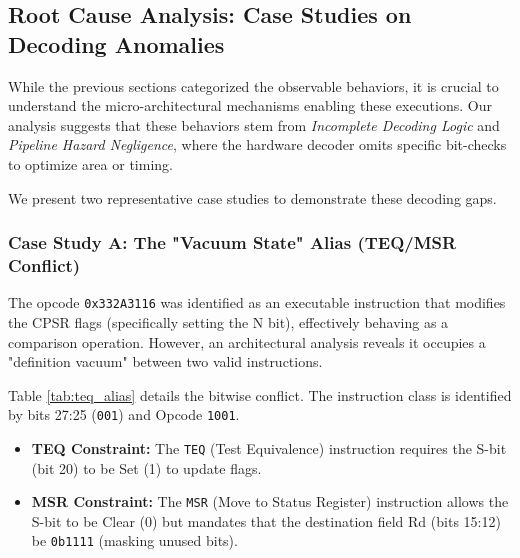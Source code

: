 \documentclass[pdflatex,sn-mathphys]{sn-jnl}%
\theoremstyle{thmstyleone}%
\theoremstyle{thmstyletwo}%
\theoremstyle{thmstylethree}%
\begin{document}
\subsection{Root Cause Analysis: Case Studies on Decoding Anomalies}
\label{sec:root_cause}

While the previous sections categorized the observable behaviors, it is crucial to understand the micro-architectural mechanisms enabling these executions. Our analysis suggests that these behaviors stem from \textit{Incomplete Decoding Logic} and \textit{Pipeline Hazard Negligence}, where the hardware decoder omits specific bit-checks to optimize area or timing.

We present two representative case studies to demonstrate these decoding gaps.

\subsubsection{Case Study A: The "Vacuum State" Alias (TEQ/MSR Conflict)}
The opcode \texttt{0x332A3116} was identified as an executable instruction that modifies the CPSR flags (specifically setting the N bit), effectively behaving as a comparison operation. However, an architectural analysis reveals it occupies a "definition vacuum" between two valid instructions.

Table \ref{tab:teq_alias} details the bitwise conflict. The instruction class is identified by bits 27:25 (\texttt{001}) and Opcode \texttt{1001}.
\begin{itemize}
    \item \textbf{TEQ Constraint:} The \texttt{TEQ} (Test Equivalence) instruction requires the S-bit (bit 20) to be Set (1) to update flags.
    \item \textbf{MSR Constraint:} The \texttt{MSR} (Move to Status Register) instruction allows the S-bit to be Clear (0) but mandates that the destination field Rd (bits 15:12) be \texttt{0b1111} (masking unused bits).
\end{itemize}
\end{document}
